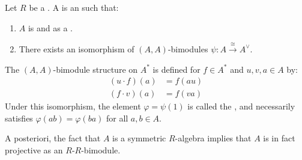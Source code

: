 \begin{definition} \label{definition:symmetric_algebra_over_a_rnig}
    Let $R$ be a . A  is an  such that:
    \begin{enumerate}
        \item $A$ is  and  as a .

        \item There exists an isomorphism of $(A, A)$-bimodules $\psi: A \xrightarrow{\cong} A^\vee$.
    \end{enumerate}
    The $(A, A)$-bimodule structure on $A^*$ is defined for $f \in A^*$ and $u, v, a \in A$ by:
    \begin{align*}
        (u \cdot f)(a) &= f(au) \\
        (f \cdot v)(a) &= f(va)
    \end{align*}
    Under this isomorphism, the element $\varphi = \psi(1)$ is called the , and necessarily satisfies $\varphi(ab) = \varphi(ba)$ for all $a, b \in A$.

    A posteriori, the fact that $A$ is a symmetric $R$-algebra implies that $A$ is in fact projective as an $R$-$R$-bimodule. 
\end{definition}
